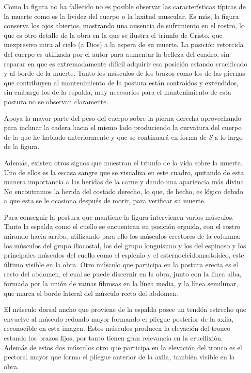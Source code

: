 Como la figura no ha fallecido no es posible observar las características típicas de la muerte como es la lividez del cuerpo o la laxitud muscular. Es más, la figura conserva los ojos abiertos, mostrando una ausencia de sufrimiento en el rostro, lo que es otro detalle de la obra en la que se ilustra el triunfo de Cristo, que inexpresivo mira al cielo (a Dios) a la espera de su muerte. La posición retorcida del cuerpo es utilizada por el autor para aumentar la belleza del cuadro, sin reparar en que es extremadamente difícil adquirir esa posición estando crucificado y al borde de la muerte. Tanto los músculos de los brazos como los de las piernas que contribuyen al mantenimiento de la postura están contraídos y extendidos, sin embargo los de la espalda, muy necesarios para el mantenimiento de esta postura no se observan claramente.

Apoya la mayor parte del peso del cuerpo sobre la pierna derecha aprovechando para inclinar la cadera hacia el mismo lado produciendo la curvatura del cuerpo de la que he hablado anteriormente y que se continuará en forma de \textit{S} a lo largo de la figura.

Además, existen otros signos que muestran el triunfo de la vida sobre la muerte. Uno de ellos es la escasa sangre que se visualiza en este cuadro, quitando de esta manera importancia a las heridas de la carne y dando una apariencia más divina. No encontramos la herida del costado derecho, lo que, de hecho, es lógico debido a que esta se le ocasiona después de morir, para verificar su muerte.

Para conseguir la postura que mantiene la figura intervienen varios músculos.
Tanto la espalda como el cuello se encuentran en posición erguida, con el rostro mirando hacia arriba, utilizando para ello los músculos erectores de la columna: los músculos del grupo iliocostal, los del grupo longuísimo y los del espinoso y los principales músculos del cuello como el esplenio y el esternocleidomastoideo, este último visible en la obra. Otro músculo que participa en la postura erecta es el recto del abdomen, el cual se puede discernir en la obra, junto con la línea alba, formada por la unión de vainas fibrosas en la línea media, y la línea semilunar, que marca el borde lateral del músculo recto del abdomen.

El músculo dorsal ancho que proviene de la espalda posee un tendón estrecho que envuelve al músculo redondo mayor formando el pliegue posterior de la axila, reconocible en esta imagen. Estos músculos producen la elevación del tronco estando los brazos fijos, por tanto tienen gran relevancia en la crucifixión. Además de estos dos músculos otro que participa en la elevación del tronco es el pectoral mayor que forma el pliegue anterior de la axila, también visible en la obra.

